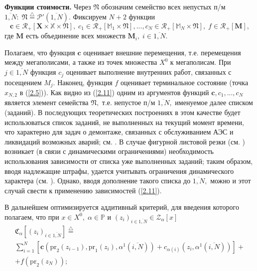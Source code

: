 \documentclass[10pt]{SPIIRAS_Proceedings}
\begin{document}
{\bf Функции стоимости.}
Через $\mathfrak{N}$
обозначим семейство всех непустых п/м
$\overline{1,N}:\;\mathfrak{N} \stackrel{\triangle}{=}  \mathcal{P}'(\overline{1,N}).$
Фиксируем $N + 2$ функции
\begin{equation}\label{2.11}
  \mathbf{c} \in \mathcal{R}_+[\mathbf{X} \times \mathbb{X} \times \mathfrak{N}],\;
  c_1 \in \mathcal{R}_+[\mathbb{M}_1 \times \mathfrak{N}],...,
  c_N \in \mathcal{R}_+[\mathbb{M}_N \times \mathfrak{N}],\;
  f \in \mathcal{R}_+[\mathbf{M}],
\end{equation}
где $\mathbf{M}$
есть объединение всех множеств
$\mathbf{M}_i,\;i \in \overline{1,N}.$

Полагаем, что функция $\mathbf{c}$ оценивает внешние перемещения,
т.е. перемещения между мегаполисами,
а также из точек множества $X^0$ к мегаполисам.
При $j \in \overline{1,N}$
функция $c_j$
оценивает выполнение внутренних работ,
связанных с посещением $M_j.$
Наконец, функция $f$
оценивает терминальное состояние
(точка $x_{N,2}$
в (\ref{2.5})).
Как видно из (\ref{2.11})
одним из аргументов функций $\mathbf{c},c_1,...,c_N$
является элемент семейства $\mathfrak{N},$
т.е. непустое п/м $\overline{1,N},$
именуемое далее списком (заданий).
В последующих теоретических построениях
в этом качестве будет использоваться список заданий,
не выполненных на текущий момент времени,
что характерно для задач о демонтаже,
связанных с обслуживанием АЭС и ликвидаций возможных аварий;
см. \cite{1,2,3}.
В случае фигурной листовой резки
(см. \cite{4}) возникает
(в связи с динамическими ограничениями)
необходимость использования зависимости
от списка уже выполненных заданий;
таким образом, вводя надлежащие штрафы,
удается учитывать ограничения динамического характера
(см. \cite{18}).
Однако, вводя дополнение такого списка до
$\overline{1,N},$
можно и этот случай свести к применению зависимостей
(\ref{2.11}).

В дальнейшем оптимизируется аддитивный критерий,
для введения которого полагаем,
что при
$x \in X^0,\;\alpha \in \mathbb{P}$ и
$(z_i)_{i \in \overline{1,N}} \in \mathcal{Z}_\alpha[x]$
\begin{multline}\label{2.12}
\mathfrak{C}_{\alpha}[(z_i)_{i \in \overline{1,N}}] \stackrel{\triangle}{=}
\\
\sum\limits_{i=1}^N [\mathbf{c}(\mathrm{pr}_2(z_{i-1}),\mathrm{pr}_1(z_i),\alpha^1(\overline{i,N})) +
c_{\alpha(i)}(z_i,\alpha^1(\overline{i,N}))] +
\\
+ f(\mathrm{pr}_2(z_N));
\end{multline}
\end{document}

